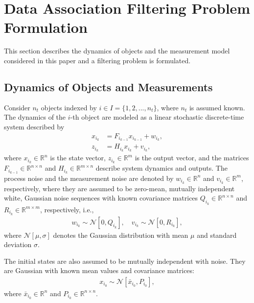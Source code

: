 \documentclass[letterpaper, 10pt, conference]{ieeeconf}
\renewcommand{\Re}{\ensuremath{\mathbb{R}}}
\begin{document}
\section{Data Association Filtering Problem Formulation}
\label{ProbDef}

 This section describes the dynamics of objects and the measurement model considered in this paper and a filtering problem is formulated. 

\subsection{Dynamics of Objects and Measurements}

%

Consider $n_t$ objects indexed by $i\in I=\{1,2,...,n_t\}$, where $n_t$ is assumed known.
The dynamics of the $i$-th object are modeled as a linear stochastic discrete-time system described by
\begin{align}
x_{i_{k}} & = F_{i_{k-1}} x_{i_{k-1}} + w_{i_{k}},\label{eqn:xkp}\\
z_{i_k} & = H_{i_k} x_{i_k} + v_{i_k},
\end{align}
where $x_{i_k}\in\Re^n$ is the state vector, $z_{i_k}\in\Re^m$ is the output vector, and  the matrices $F_{i_{k-1}}\in\Re^{n\times n}$ and $H_{i_k}\in\Re^{m\times n}$ describe system dynamics and outputs.
The process noise and the measurement noise are denoted by $w_{i_k}\in\Re^n$ and $v_{i_k}\in\Re^m$, respectively, where they are assumed to be zero-mean, mutually independent white, Gaussian noise sequences with known covariance matrices $Q_{i_k}\in\Re^{n\times n}$ and $R_{i_k}\in\Re^{m\times m}$, respectively, i.e.,
\begin{align}
w_{i_k} \sim \mathcal{N}[0,Q_{i_k}],\quad
v_{i_k} \sim \mathcal{N}[0,R_{i_k}],
\end{align}
where $\mathcal{N}[\mu,\sigma]$ denotes the Gaussian distribution with mean $\mu$ and standard deviation $\sigma$.


The initial states are also assumed to be mutually independent with noise. They are Gaussian with known mean values and covariance matrices:
\begin{align}
x_{i_0} \sim \mathcal{N}[\bar x_{i_0}, P_{i_0}],\label{eqn:xi0}
\end{align}
where $\bar x_{i_0}\in\Re^n$ and $P_{i_0}\in\Re^{n\times n}$. 
\end{document}
